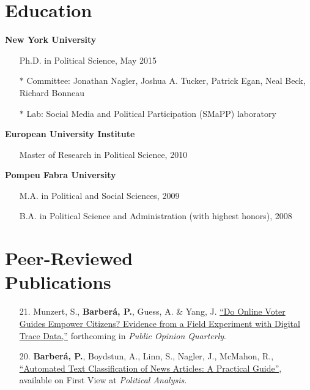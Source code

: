\documentclass[margin,line,11pt]{resume}
\begin{document}
\begin{resume}
    \section{\mysidestyle Education}
\textbf{New York University}
\begin{itemize}
\item[] Ph.D. in Political Science, May 2015
\vspace{-.15cm}
\item[] $\ast$ Committee: Jonathan Nagler, Joshua A. Tucker, Patrick Egan, Neal Beck, Richard Bonneau
\vspace{-.15cm}
\item[] $\ast$  Lab: Social Media and Political Participation (SMaPP) laboratory
\end{itemize}
\vspace{-.30cm}
\textbf{European University Institute} 
\begin{itemize}
\item[] Master of Research in Political Science, 2010
\end{itemize}
\vspace{-.30cm}
\textbf{Pompeu Fabra University} 
\begin{itemize}
\item[] M.A. in Political and Social Sciences, 2009
\vspace{-.15cm}
\item[] B.A. in Political Science and Administration (with highest honors), 2008 
\end{itemize}

    \section{\mysidestyle Peer-Reviewed\\Publications}
\vspace{.15cm}    
\begin{itemize}[leftmargin=5.5mm]

\item[21.] Munzert, S., \textbf{Barber\'{a}, P.}, Guess, A. \& Yang, J. \href{https://osf.io/7prz4/}{``Do Online Voter Guides Empower Citizens? Evidence from a Field Experiment with Digital Trace Data,''} forthcoming in \textit{Public Opinion Quarterly}.

\item[20.] \textbf{Barber\'{a}, P.}, Boydstun, A., Linn, S., Nagler, J., McMahon, R.,  \href{https://www.cambridge.org/core/journals/political-analysis/article/automated-text-classification-of-news-articles-a-practical-guide/10462DB284B1CD80C0FAE796AD786BC6}{``Automated Text Classification of News Articles: A Practical Guide''}, available on First View at \textit{Political Analysis}.


\end{itemize}
\end{resume}
\end{document}
